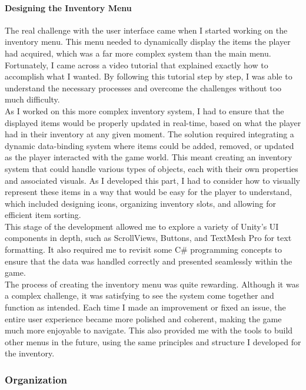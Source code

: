 \documentclass{article}
\begin{document}
\paragraph{Designing the Inventory Menu}\hfill

The real challenge with the user interface came when I started working on the inventory menu. This menu needed to dynamically display the items the player had acquired, which was a far more complex system than the main menu. Fortunately, I came across a video tutorial that explained exactly how to accomplish what I wanted. By following this tutorial step by step, I was able to understand the necessary processes and overcome the challenges without too much difficulty.\\

As I worked on this more complex inventory system, I had to ensure that the displayed items would be properly updated in real-time, based on what the player had in their inventory at any given moment. The solution required integrating a dynamic data-binding system where items could be added, removed, or updated as the player interacted with the game world. This meant creating an inventory system that could handle various types of objects, each with their own properties and associated visuals. As I developed this part, I had to consider how to visually represent these items in a way that would be easy for the player to understand, which included designing icons, organizing inventory slots, and allowing for efficient item sorting.\\

This stage of the development allowed me to explore a variety of Unity’s UI components in depth, such as ScrollViews, Buttons, and TextMesh Pro for text formatting. It also required me to revisit some C\# programming concepts to ensure that the data was handled correctly and presented seamlessly within the game.\\

The process of creating the inventory menu was quite rewarding. Although it was a complex challenge, it was satisfying to see the system come together and function as intended. Each time I made an improvement or fixed an issue, the entire user experience became more polished and coherent, making the game much more enjoyable to navigate. This also provided me with the tools to build other menus in the future, using the same principles and structure I developed for the inventory.


\subsubsection{Organization}\hfill
\end{document}
